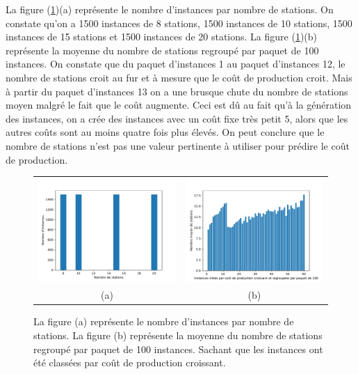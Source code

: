 La figure (\ref{6000_periode_station})(a) représente le nombre d'instances par nombre de stations. On constate qu'on a 1500 instances de 8 stations, 1500 instances de 10 stations, 1500 instances de 15 stations et 1500 instances de 20 stations. La figure (\ref{6000_periode_station})(b) représente la moyenne du nombre de stations regroupé par paquet de 100 instances. On constate que du paquet d'instances 1 au paquet d'instances 12, le nombre de stations croit au fur et à mesure que le coût de production croit. Mais à partir du paquet d'instances 13  on a une brusque chute du nombre de stations moyen malgré le fait que le coût augmente. Ceci est dû au fait qu'à la génération des instances, on a crée des instances avec un coût fixe très petit 5, alors que les autres coûts sont au moins quatre fois plus élevés. On peut conclure que le nombre de stations n'est pas une valeur pertinente à utiliser pour prédire le coût de production.
\begin{figure}[H]
	\centering
	\begin{tabular}{c c}
		\includegraphics[width=9cm]{images_these/CourbeM.pdf} &
		\includegraphics[width=9cm]{images_these/Stats_instances_Nbstations.pdf}
		\\
		(a) & (b)
	\end{tabular}
	\caption[Moyenne du nombre de stations regroupé par paquet de 100 instances]{La figure (a) représente le nombre d'instances par nombre de stations. La figure (b) représente la moyenne du nombre de stations regroupé par paquet de 100 instances. Sachant que les instances ont été classées par coût de production croissant. }\label{6000_periode_station}
\end{figure}

